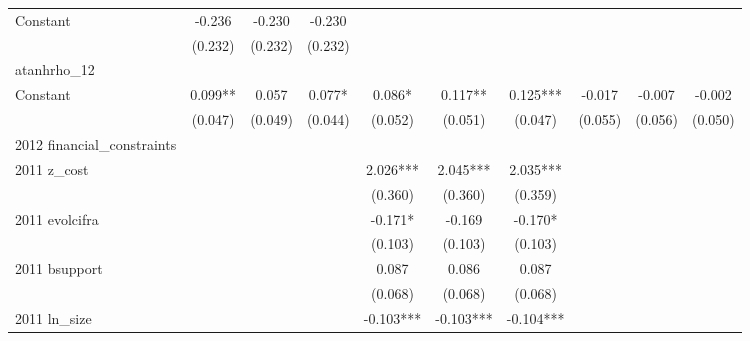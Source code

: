 \begin{table}[htbp]
\begin{tabular}{l*{9}{c}}
Constant            &      -0.236   &      -0.230   &      -0.230   &               &               &               &               &               &               \\
                    &     (0.232)   &     (0.232)   &     (0.232)   &               &               &               &               &               &               \\
\hline
atanhrho\_12         &               &               &               &               &               &               &               &               &               \\
Constant            &       0.099** &       0.057   &       0.077*  &       0.086*  &       0.117** &       0.125***&      -0.017   &      -0.007   &      -0.002   \\
                    &     (0.047)   &     (0.049)   &     (0.044)   &     (0.052)   &     (0.051)   &     (0.047)   &     (0.055)   &     (0.056)   &     (0.050)   \\
\hline
2012 financial\_constraints&               &               &               &               &               &               &               &               &               \\
2011 z\_cost         &               &               &               &       2.026***&       2.045***&       2.035***&               &               &               \\
                    &               &               &               &     (0.360)   &     (0.360)   &     (0.359)   &               &               &               \\
2011 evolcifra      &               &               &               &      -0.171*  &      -0.169   &      -0.170*  &               &               &               \\
                    &               &               &               &     (0.103)   &     (0.103)   &     (0.103)   &               &               &               \\
2011 bsupport       &               &               &               &       0.087   &       0.086   &       0.087   &               &               &               \\
                    &               &               &               &     (0.068)   &     (0.068)   &     (0.068)   &               &               &               \\
2011 ln\_size        &               &               &               &      -0.103***&      -0.103***&      -0.104***&               &               &               \\

\end{tabular}
\end{table}
